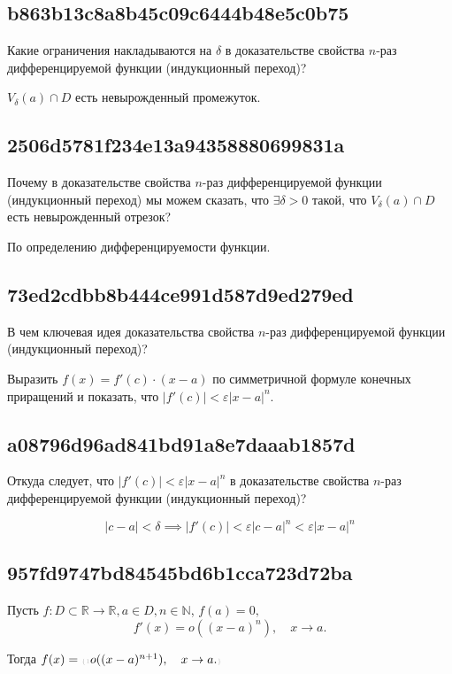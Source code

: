 \documentclass[11pt, a5paper]{article}
\newenvironment{note}[1]{\goodbreak\par\subsection{\hfill \color{lightgray}\tiny #1}}{}
\newenvironment{cloze}[2][\ldots]{\begin{leftbar}}{\end{leftbar}}
\newenvironment{icloze}[2][\ldots]{%
  \ignorespaces\text{\tiny \color{lightgray}\{#2} %
}{%
  \text{\tiny\color{lightgray}\}}\unskip%
}
\begin{document}
\begin{note}{b863b13c8a8b45c09c6444b48e5c0b75}
    Какие ограничения накладываются на \( \delta \) в доказательстве свойства \( n \)-раз дифференцируемой функции (индукционный переход)?

    \begin{cloze}{1}
        \( V_{\delta} (a) \cap D \) есть невырожденный промежуток.
    \end{cloze}
\end{note}

\begin{note}{2506d5781f234e13a94358880699831a}
    Почему в доказательстве свойства \( n \)-раз дифференцируемой функции (индукционный переход) мы можем сказать, что
    \( \exists \delta > 0 \) такой,  что \( V_{\delta} (a) \cap D \) есть невырожденный отрезок?

    \begin{cloze}{1}
        По определению дифференцируемости функции.
    \end{cloze}
\end{note}

\begin{note}{73ed2cdbb8b444ce991d587d9ed279ed}
    В чем ключевая идея доказательства свойства \( n \)-раз дифференцируемой функции (индукционный переход)?

    \begin{cloze}{1}
        Выразить \( f(x) = f'(c) \cdot (x - a) \) по симметричной формуле конечных приращений и показать, что \( |f'(c)| < \varepsilon |x - a|^{n} \).
    \end{cloze}
\end{note}

\begin{note}{a08796d96ad841bd91a8e7daaab1857d}
    Откуда следует, что \( |f'(c)| < \varepsilon|x - a|^{n}  \) в доказательстве свойства \( n \)-раз дифференцируемой функции (индукционный переход)?

    \begin{cloze}{1}
        \[
            |c - a| < \delta \implies |f'(c)| < \varepsilon|c - a|^{n} < \varepsilon|x - a|^{n}
        \]
    \end{cloze}
\end{note}

\begin{note}{957fd9747bd84545bd6b1cca723d72ba}
    Пусть \( f : D \subset \mathbb R \to \mathbb R, a \in D, n \in \mathbb N \), \begin{icloze}{2}\(f(a) = 0, \)
    \[
        f'(x) = o((x - a)^{n} ), \quad x \to a.
    \]\end{icloze}

    Тогда \( f(x) = \begin{icloze}{1}o((x - a)^{n + 1}), \quad x \to a.\end{icloze} \)
\end{note}
\end{document}
